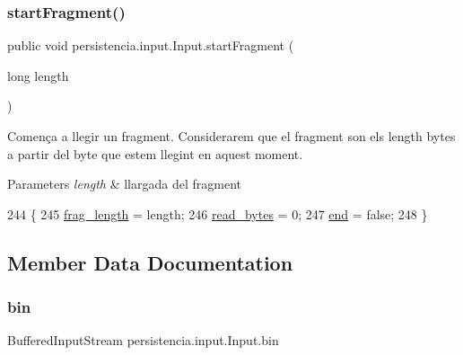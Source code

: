 \subsubsection{\texorpdfstring{start\+Fragment()}{startFragment()}}
{\footnotesize\ttfamily public void persistencia.\+input.\+Input.\+start\+Fragment (\begin{DoxyParamCaption}\item[{long}]{length }\end{DoxyParamCaption})\hspace{0.3cm}{\ttfamily [inline]}}



Comença a llegir un fragment. Considerarem que el fragment son els length bytes a partir del byte que estem llegint en aquest moment. 


\begin{DoxyParams}{Parameters}
{\em length} & llargada del fragment \\
\hline
\end{DoxyParams}

\begin{DoxyCode}
244                                            \{
245         \hyperlink{classpersistencia_1_1input_1_1Input_adae91120899054fe5200d5e307840042}{frag\_length} = length;
246         \hyperlink{classpersistencia_1_1input_1_1Input_ace2c934234f82fb07ae169b50f71cd32}{read\_bytes} = 0;
247         \hyperlink{classpersistencia_1_1input_1_1Input_aa986cd4af0178e1a80f551dcd8936125}{end} = \textcolor{keyword}{false};
248     \}
\end{DoxyCode}


\subsection{Member Data Documentation}
\mbox{\label{classpersistencia_1_1input_1_1Input_aa4b622d30a090256ce05c5082cdb0791}} 
\subsubsection{\texorpdfstring{bin}{bin}}
{\footnotesize\ttfamily Buffered\+Input\+Stream persistencia.\+input.\+Input.\+bin\hspace{0.3cm}{\ttfamily [private]}}


